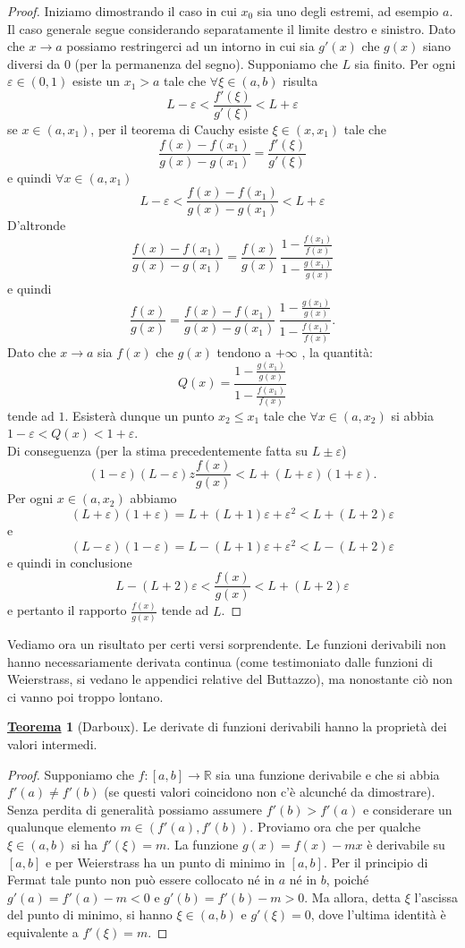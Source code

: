 \documentclass[a4paper,twoside]{article}
\renewcommand{\epsilon}{\varepsilon}
\newcommand{\R}{\mathbb{R}}
\theoremstyle{definition}
\newtheorem{theorem}{\color{Red}\underline{\textrm Teorema}}
\numberwithin{theorem}{section}
\begin{document}
\begin{proof}
    Iniziamo dimostrando il caso in cui $x_0$ sia uno degli estremi, ad esempio $a$. Il caso generale segue considerando separatamente il limite destro e sinistro. Dato che $x\to a$ possiamo restringerci ad un intorno in cui sia $g'(x)$ che $g(x)$ siano diversi da 0 (per la permanenza del segno).
    Supponiamo che $L$ sia finito. Per ogni $\epsilon\in(0,1)$ esiste un $x_1>a$ tale che $\forall\xi\in(a,b)$ risulta $$L-\epsilon<\frac{f'(\xi)}{g'(\xi)}<L+\epsilon$$ se $x\in(a,x_1)$, per il teorema di Cauchy esiste $\xi\in(x,x_1)$ tale che $$\frac{f(x)-f(x_1)}{g(x)-g(x_1)}=\frac{f'(\xi)}{g'(\xi)}$$
    e quindi $\forall x\in(a,x_1)$ $$L-\epsilon<\frac{f(x)-f(x_1)}{g(x)-g(x_1)}< L+\epsilon$$ D'altronde $$\frac{f(x)-f(x_1)}{g(x)-g(x_1)}=\frac{f(x)}{g(x)}\ \frac{1-\frac{f(x_1)}{f(x)}}{1-\frac{g(x_1)}{g(x)}}$$ 
    e quindi $$\frac{f(x)}{g(x)}=\frac{f(x)-f(x_1)}{g(x)-g(x_1)}\ \frac{1-\frac{g(x_1)}{g(x)}}{1-\frac{f(x_1)}{f(x)}}.$$
    Dato che $x\to a$ sia $f(x)$ che $g(x)$ tendono a $+\infty$ , la quantità: $$Q(x)=\frac{1-\frac{g(x_1)}{g(x)}}{1-\frac{f(x_1)}{f(x)}}$$
    tende ad $1$. Esisterà dunque un punto $x_2\leq x_1$ tale che $\forall x\in(a,x_2)$ si abbia $1-\epsilon<Q(x)<1+\epsilon$.\\ Di conseguenza (per la stima precedentemente fatta su $L\pm\epsilon$)
    $$(1-\epsilon)(L-\epsilon)z\frac{f(x)}{g(x)}<L+(L+\epsilon)(1+\epsilon).$$
    Per ogni $x\in(a,x_2)$ abbiamo $$(L+\epsilon)(1+\epsilon)=L+(L+1)\epsilon + \epsilon^2<L+(L+2)\epsilon$$
    e
    $$(L-\epsilon)(1-\epsilon)=L-(L+1)\epsilon + \epsilon^2<L-(L+2)\epsilon$$
    e quindi in conclusione
    $$L-(L+2)\epsilon<\frac{f(x)}{g(x)}<L+(L+2)\epsilon$$ e pertanto il rapporto $\frac{f(x)}{g(x)}$ tende ad $L$.
\end{proof}



Vediamo ora un risultato per certi versi sorprendente. Le funzioni derivabili non hanno necessariamente derivata continua (come testimoniato dalle funzioni di Weierstrass, si vedano le appendici relative del Buttazzo), ma nonostante ciò non ci vanno poi troppo lontano.

\begin{theorem}[Darboux] Le derivate di funzioni derivabili hanno la proprietà dei valori intermedi. 
\end{theorem}

\begin{proof} Supponiamo che $f:[a,b]\to\R$ sia una funzione derivabile e che si abbia $f'(a)\neq f'(b)$ (se questi valori coincidono non c'è alcunché da dimostrare). Senza perdita di generalità possiamo assumere $f'(b) > f'(a)$ e considerare un qualunque elemento $m\in(f'(a),f'(b))$. Proviamo ora che per qualche $\xi\in(a,b)$ si ha $f'(\xi)=m$. La funzione $g(x)=f(x)-mx$ è derivabile su $[a,b]$ e per Weierstrass ha un punto di minimo in $[a,b]$. Per il principio di Fermat tale punto non può essere collocato né in $a$ né in $b$, poiché $g'(a)=f'(a)-m < 0$ e $g'(b)=f'(b)-m > 0$. Ma allora, detta $\xi$ l'ascissa del punto di minimo, si hanno $\xi\in(a,b)$ e $g'(\xi)=0$, dove l'ultima identità è equivalente a $f'(\xi)=m$. 
\end{proof}
\end{document}
